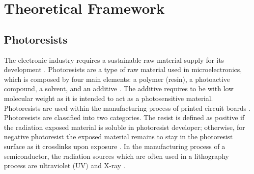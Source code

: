 
\chapter{Theoretical Framework} %

\label{Chapter:TheoreticalFramework}


\section{Photoresists}
The electronic industry requires a sustainable raw material supply for its development \cite{Sutikno2016}. Photoresists are a type of raw material used in microelectronics, which is composed by four main elements: a polymer (resin), a photoactive compound, a solvent, and an additive \cite{Schuster2009}. The additive requires to be with low molecular weight as it is intended to act as a photosensitive material. Photoresists are used within the manufacturing process of printed circuit boards \cite{Staab2011}. Photoresists are classified into two categories. The resist is defined as positive if the radiation exposed material is soluble in photoresist developer; otherwise, for negative photoresist the exposed material remains to stay in the photoresist surface as it crosslinks upon exposure \cite{Landis2011,Sharma2012}. In the manufacturing process of a semiconductor, the radiation sources which are often used in a lithography process are ultraviolet (UV) and X-ray \cite{Mekaru2015}.

